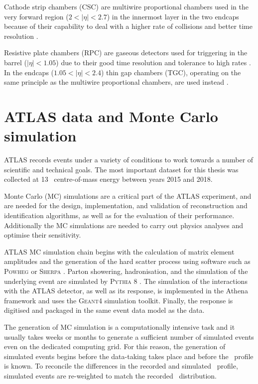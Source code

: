 
Cathode strip chambers (CSC) are multiwire proportional chambers
used in the very forward region ($2 < |\eta| < 2.7$)
in the innermost layer in the two endcaps because of their capability
to deal with a higher rate of collisions and better time resolution
\cite{Aad:2010ag}.

Resistive plate chambers (RPC) are gaseous detectors used for
triggering in the barrel ($|\eta| < 1.05$) due to their good time resolution
and tolerance to high rates \cite{Cattani_2011}. In the endcaps ($1.05 < |\eta| < 2.4$)
thin gap chambers (TGC), operating on the same principle as the multiwire
proportional chambers, are used instead \cite{Nagai:1996mf}.

\section{ATLAS data and Monte Carlo simulation}

ATLAS records events under a variety of conditions to work towards a number of
scientific and technical goals. The most important dataset for this thesis
was collected at 13 \TeV~centre-of-mass energy between years 2015
and 2018.

Monte Carlo (MC) simulations are a critical part of the ATLAS experiment,
and are needed for the design, implementation, and validation of
reconstruction and identification algorithms, as well as for the evaluation
of their performance. Additionally the MC simulations are needed to
carry out physics analyses and optimise their sensitivity.

ATLAS MC simulation chain begins with the calculation of matrix element 
amplitudes and the generation of the hard scatter process using
software such as \textsc{Powheg} \cite{powheg, Frixione_2007, Alioli_2010}
or \textsc{Sherpa} \cite{sherpa1, sherpa2}. Parton showering, hadronisation,
and the simulation of the underlying event are simulated by
\textsc{Pythia} 8 \cite{Sj_strand_2008}. The simulation of the
interactions with the ATLAS detector, as well as its response, is
implemented in the Athena framework \cite{Aad:2010ah, Duckeck:2005rb} and uses the
\textsc{Geant4} \cite{Agostinelli:2002hh, 1610988, ALLISON2016186}
simulation toolkit. Finally, the response is digitised
and packaged in the same event data model \cite{Buckley_2015} as the
data.

The generation of MC simulation is a computationally intensive task
and it usually takes weeks or months to generate a sufficient number
of simulated events even on the dedicated computing grid. For this
reason, the generation of simulated events begins before the data-taking
takes place and before the \pileup~profile is known. To reconcile the
differences in the recorded and simulated \pileup~profile, simulated
events are re-weighted to match the recorded \pileup~distribution.







